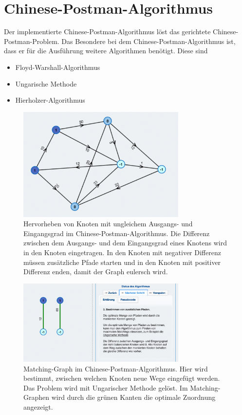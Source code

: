 \section{Chinese-Postman-Algorithmus} %
Der implementierte Chinese-Postman-Algorithmus löst das gerichtete Chinese-Postman-Problem. 
Das Besondere bei dem Chinese-Postman-Algorithmus ist, dass er für die Ausführung weitere Algorithmen benötigt. Diese sind 
\begin{itemize}
\item Floyd-Warshall-Algorithmus
\item Ungarische Methode
\item Hierholzer-Algorithmus
\end{itemize}

\begin{figure}[h!]
	\centering
	\includegraphics[width=0.75\textwidth]{figures/postman_unbalanced}
	\caption[Chinese-Postman: Unbalancierte Knoten]{Hervorheben von Knoten mit ungleichem Ausgangs- und Eingangsgrad im Chinese-Postman-Algorithmus. Die Differenz zwischen dem Ausgangs- und dem Eingangsgrad eines Knotens wird in den Knoten eingetragen. In den Knoten mit negativer Differenz müssen zusätzliche Pfade starten und in den Knoten mit positiver Differenz enden, damit der Graph eulersch wird. }\label{fig:postman_unbalanced}
\end{figure}

\begin{figure}[h!]
	\centering
	\includegraphics[width=0.75\textwidth]{figures/postman_matching}
	\caption[Chinese-Postman: Matching-Graph]{Matching-Graph im Chinese-Postman-Algorithmus. Hier wird bestimmt, zwischen welchen Knoten neue Wege eingefügt werden. Das Problem wird mit Ungarischer Methode gelöst. Im Matching-Graphen wird durch die grünen Kanten die optimale Zuordnung angezeigt.}\label{fig:postman_matching}
\end{figure}

